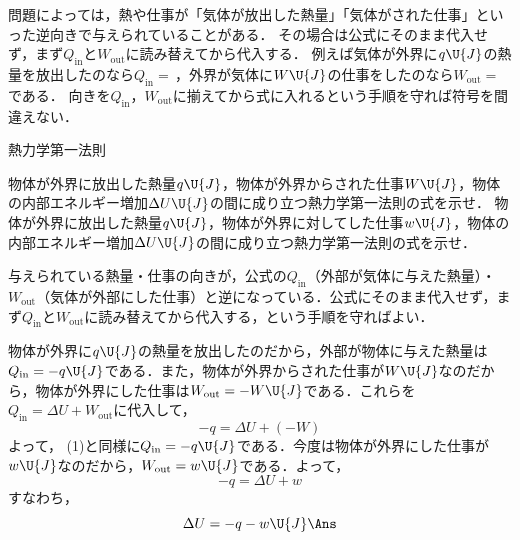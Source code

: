 問題によっては，熱や仕事が「気体が放出した熱量」「気体がされた仕事」といった{\gtfamily 逆向き}で与えられていることがある．
その場合は公式にそのまま代入せず，まず$Q_{\mathrm{in}}$と$W_{\mathrm{out}}$に読み替えてから代入する．
例えば気体が外界に$q\U{J}$の熱量を放出したのなら$Q_{\mathrm{in}}=$\,，外界が気体に$W\U{J}$の仕事をしたのなら$W_{\mathrm{out}}=$\,である．
{\gtfamily 向きを$Q_{\mathrm{in}}$，$W_{\mathrm{out}}$に揃えてから式に入れる}という手順を守れば符号を間違えない．

\bsNeed{68mm}
\begin{reidaiunit}
\begin{reidai}{熱力学第一法則}
\begin{komon}
 物体が外界に放出した熱量$q\U{J}$，物体が外界からされた仕事$W\U{J}$，物体の内部エネルギー増加$\Delta U\U{J}$の間に成り立つ熱力学第一法則の式を示せ．
 物体が外界に放出した熱量$q\U{J}$，物体が外界に対してした仕事$w\U{J}$，物体の内部エネルギー増加$\Delta U\U{J}$の間に成り立つ熱力学第一法則の式を示せ．
\end{komon}
\end{reidai}

\begin{sisinE}
与えられている熱量・仕事の向きが，公式の$Q_{\mathrm{in}}$（外部が気体に与えた熱量）・$W_{\mathrm{out}}$（気体が外部にした仕事）と逆になっている．公式にそのまま代入せず，まず$Q_{\mathrm{in}}$と$W_{\mathrm{out}}$に読み替えてから代入する，という手順を守ればよい．
\end{sisinE}


\begin{kaitou}
\begin{komon}
 物体が外界に$q\U{J}$の熱量を放出したのだから，外部が物体に与えた熱量は$Q_{\mathrm{in}}=-q\U{J}$である．また，物体が外界からされた仕事が$W\U{J}$なのだから，物体が外界にした仕事は$W_{\mathrm{out}}=-W\U{J}$である．これらを$Q_{\mathrm{in}}=\Delta U+W_{\mathrm{out}}$に代入して，
       \[-q=\Delta U+(-W)\]
       よって，
 (1)と同様に$Q_{\mathrm{in}}=-q\U{J}$である．今度は物体が外界にした仕事が$w\U{J}$なのだから，$W_{\mathrm{out}}=w\U{J}$である．よって，
       \[-q=\Delta U+w\]
       すなわち，
       \[\Delta U=-q-w\U{J}\Ans\]
\end{komon}
\end{kaitou}
\end{reidaiunit}


